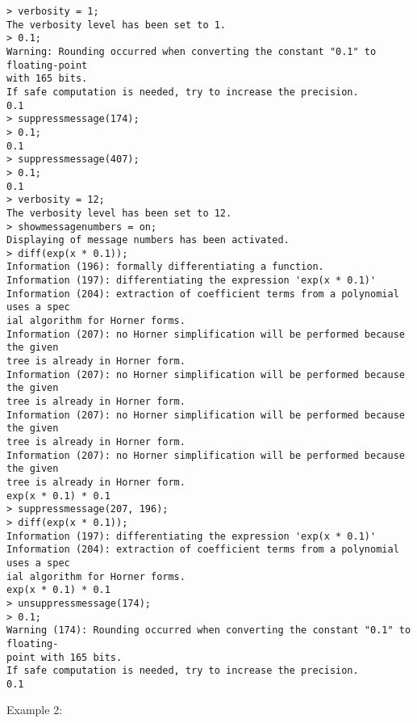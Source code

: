 \begin{center}\begin{minipage}{15cm}\begin{Verbatim}[frame=single]
> verbosity = 1;
The verbosity level has been set to 1.
> 0.1;
Warning: Rounding occurred when converting the constant "0.1" to floating-point 
with 165 bits.
If safe computation is needed, try to increase the precision.
0.1
> suppressmessage(174);
> 0.1;
0.1
> suppressmessage(407);
> 0.1;
0.1
> verbosity = 12;
The verbosity level has been set to 12.
> showmessagenumbers = on;
Displaying of message numbers has been activated.
> diff(exp(x * 0.1));
Information (196): formally differentiating a function.
Information (197): differentiating the expression 'exp(x * 0.1)'
Information (204): extraction of coefficient terms from a polynomial uses a spec
ial algorithm for Horner forms.
Information (207): no Horner simplification will be performed because the given 
tree is already in Horner form.
Information (207): no Horner simplification will be performed because the given 
tree is already in Horner form.
Information (207): no Horner simplification will be performed because the given 
tree is already in Horner form.
Information (207): no Horner simplification will be performed because the given 
tree is already in Horner form.
exp(x * 0.1) * 0.1
> suppressmessage(207, 196);
> diff(exp(x * 0.1));
Information (197): differentiating the expression 'exp(x * 0.1)'
Information (204): extraction of coefficient terms from a polynomial uses a spec
ial algorithm for Horner forms.
exp(x * 0.1) * 0.1
> unsuppressmessage(174);
> 0.1;
Warning (174): Rounding occurred when converting the constant "0.1" to floating-
point with 165 bits.
If safe computation is needed, try to increase the precision.
0.1
\end{Verbatim}
\end{minipage}\end{center}
\noindent Example 2: 
